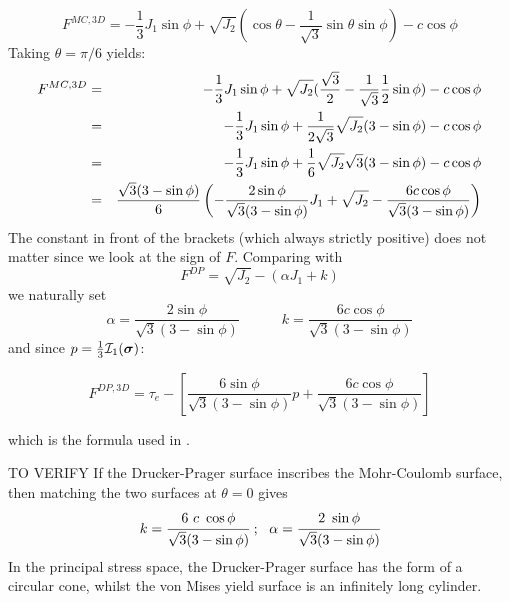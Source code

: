 \[
F^{MC,3D} = -\frac{1}{3}J_1 \sin \phi  + \sqrt{J_2} ( \cos \theta - \frac{1}{\sqrt{3}} \sin \theta  \sin \phi ) - c \cos \phi 
\]
Taking $\theta=\pi/6$ yields:
\begin{eqnarray}
F^{MC,3D} 
&=& -\frac{1}{3}J_1 \sin \phi  + \sqrt{J_2} ( \frac{\sqrt{3}}{2} - \frac{1}{\sqrt{3}} \frac{1}{2}  \sin \phi ) - c \cos \phi  \nonumber\\
&=& -\frac{1}{3}J_1 \sin \phi  + \frac{1}{2\sqrt{3}}\sqrt{J_2} ( 3 -  \sin \phi ) - c \cos \phi  \nonumber\\
&=& -\frac{1}{3}J_1 \sin \phi  + \frac{1}{6}\sqrt{J_2} \sqrt{3}( 3 -  \sin \phi ) - c \cos \phi  \nonumber\\
&=& \frac{\sqrt{3}(3-\sin\phi)}{6} \left( -  \frac{2 \sin \phi}{\sqrt{3}(3-\sin\phi)}   J_1  + \sqrt{J_2}  - \frac{6c \cos \phi}{\sqrt{3}(3-\sin\phi)} \right) \nonumber
\end{eqnarray}
The constant in front of the brackets (which always strictly positive) does not matter since we look at the sign of $F$.
Comparing with 
\[
F^{DP}=\sqrt{J_2} - (\alpha J_1 + k) \label{dpcriterion} 
\]
we naturally set 
\[
\alpha =\frac{2 \sin \phi}{\sqrt{3}(3-\sin\phi)}
\quad\quad\quad  
k =  \frac{6c \cos \phi}{\sqrt{3}(3-\sin\phi)} 
\]
and since $p=\frac{1}{3}{\cal I}_1({\bm \sigma})$:
\begin{mdframed}[backgroundcolor=blue!5]
\begin{equation}
F^{DP,3D} = \tau_e  - \left[ \frac{6 \sin \phi}{\sqrt{3}(3-\sin\phi)}   p  + 
\frac{6c \cos \phi}{\sqrt{3}(3-\sin\phi)}  \right]
\label{eqdp3D}
\end{equation}
\end{mdframed}
which is the formula used in \cite{gltf18}.





\vspace{1.3cm}
TO VERIFY
If the Drucker-Prager surface inscribes the Mohr-Coulomb surface, then matching the two surfaces at $\theta=0$  gives
\[
k = \cfrac{6~c~\cos\phi}{\sqrt{3}(3-\sin\phi)} ~;~~ \alpha = \cfrac{2~\sin\phi}{\sqrt{3}(3-\sin\phi)} 
\]
In the principal stress space, the Drucker-Prager surface has the form of a circular cone, whilst the von Mises yield surface is an infinitely long cylinder.



